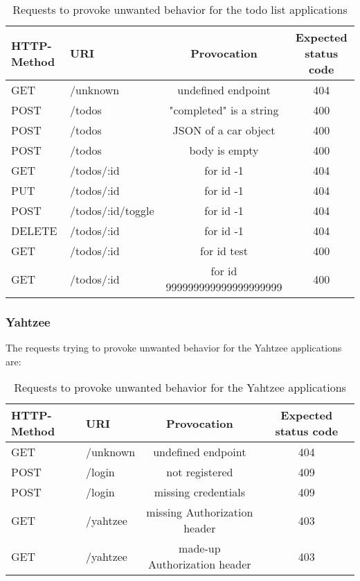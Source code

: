 \documentclass[a4paper,titlepage]{article}
\begin{document}
\begin{table}[h!]
	\begin{tabularx}{\textwidth}{|X|X|c|c|}
		\hline
		HTTP-Method & URI               & Provocation                  & Expected status code \\
		\hline
		GET         & /unknown          & undefined endpoint           & 404                  \\
		POST        & /todos            & "completed" is a string      & 400                  \\
		POST        & /todos            & JSON of a car object         & 400                  \\
		POST        & /todos            & body is empty                & 400                  \\
		GET         & /todos/:id        & for id -1                    & 404                  \\
		PUT         & /todos/:id        & for id -1                    & 404                  \\
		POST        & /todos/:id/toggle & for id -1                    & 404                  \\
		DELETE      & /todos/:id        & for id -1                    & 404                  \\
		GET         & /todos/:id        & for id test                  & 400                  \\
		GET         & /todos/:id        & for id 999999999999999999999 & 400                  \\
		\hline
	\end{tabularx}
	\caption{
		Requests to provoke unwanted behavior for the todo list applications
	}
\end{table}

\subsubsection{Yahtzee}
The requests trying to provoke unwanted behavior for the Yahtzee applications
are:

\begin{table}[h!]
	\begin{tabularx}{\textwidth}{|X|X|c|c|}
		\hline
		HTTP-Method & URI      & Provocation                   	& Expected status code \\
		\hline
		GET         & /unknown & undefined endpoint            	& 404                  \\
		POST        & /login   & not registered		           	& 409                  \\
		POST        & /login   & missing credentials        	& 409                  \\
		GET         & /yahtzee & missing Authorization header	& 403                  \\
		GET         & /yahtzee & made-up Authorization header	& 403                  \\
		\hline
	\end{tabularx}
	\caption{
		Requests to provoke unwanted behavior for the Yahtzee applications
	}
\end{table}
\end{document}
